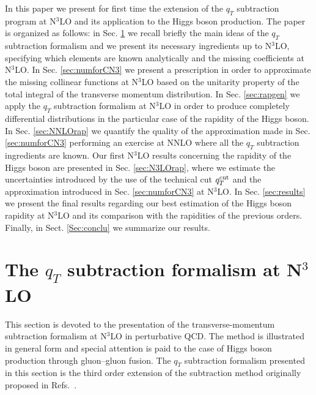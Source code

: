 \documentclass[12pt]{article}
\def\qt{q_T}
\begin{document}
In this paper we present for first time the extension of the $q_{T}$ subtraction program at N$^{3}$LO and its application to the Higgs boson production. 
The paper is organized as follows: in Sec. \ref{sec:forma} we recall briefly the main ideas of the $q_{T}$ subtraction formalism and we present its necessary ingredients up to  N$^{3}$LO, specifying which elements are known analytically and the missing coefficients at N$^{3}$LO. In Sec. \ref{sec:numforCN3} we present a prescription in order to approximate the missing collinear functions at N$^{3}$LO based on the unitarity property of the total integral of the transverse momentum distribution. In Sec. \ref{sec:rapgen} we apply the $q_{T}$ subtraction formalism at N$^{3}$LO in order to produce completely differential distributions in the particular case of the rapidity of the Higgs boson. In Sec. \ref{sec:NNLOrap} we quantify the quality of the approximation made in Sec. \ref{sec:numforCN3} performing an exercise at NNLO where all the $q_{T}$ subtraction ingredients are known. Our first N$^{3}$LO results concerning the rapidity of the Higgs boson are presented in Sec. \ref{sec:N3LOrap}, where we estimate the uncertainties introduced by the use of the technical cut $\qt^{{\rm cut}}$ and the approximation introduced in Sec. \ref{sec:numforCN3} at N$^{3}$LO. In Sec. \ref{sec:results} we present the final results regarding our best estimation of the Higgs boson rapidity at N$^{3}$LO and its comparison with the rapidities of the previous orders. Finally, in Sect. \ref{Sec:conclu} we summarize our results. 





\section{The $\qt$ subtraction formalism at N$^{3}$LO}
\label{sec:forma}
This section is devoted to the presentation of the transverse-momentum subtraction formalism at N$^{3}$LO in perturbative QCD. The method is illustrated in general form and special attention is paid to the case of Higgs boson production through gluon--gluon fusion. The $\qt$ subtraction formalism presented in this section is the third order extension of the subtraction method originally proposed in Refs.~\cite{Catani:2007vq,Bozzi:2005wk,Bozzi:2003jy}.
\end{document}
